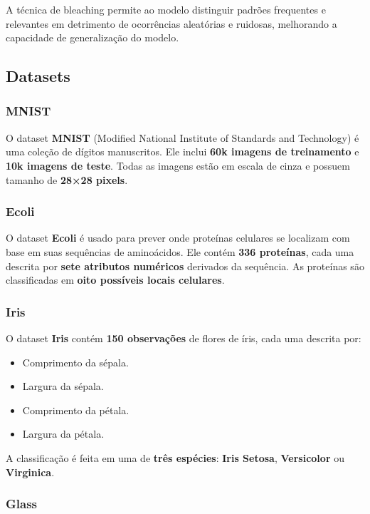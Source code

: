 \documentclass{article}
\begin{document}
A técnica de bleaching permite ao modelo distinguir padrões frequentes e relevantes em detrimento de ocorrências aleatórias e ruidosas, melhorando a capacidade de generalização do modelo.

\subsection{Datasets}

\subsubsection{MNIST}

O dataset \textbf{MNIST} (Modified National Institute of Standards and Technology) é uma coleção de dígitos manuscritos. Ele inclui \textbf{60k imagens de treinamento} e \textbf{10k imagens de teste}. Todas as imagens estão em escala de cinza e possuem tamanho de \textbf{28×28 pixels}.

\subsubsection{Ecoli}

O dataset \textbf{Ecoli} é usado para prever onde proteínas celulares se localizam com base em suas sequências de aminoácidos. Ele contém \textbf{336 proteínas}, cada uma descrita por \textbf{sete atributos numéricos} derivados da sequência. As proteínas são classificadas em \textbf{oito possíveis locais celulares}.

\subsubsection{Iris}

O dataset \textbf{Iris} contém \textbf{150 observações} de flores de íris, cada uma descrita por:

\begin{itemize}
    \item Comprimento da sépala.
    \item Largura da sépala.
    \item Comprimento da pétala.
    \item Largura da pétala.
\end{itemize}

A classificação é feita em uma de \textbf{três espécies}: \textbf{Iris Setosa}, \textbf{Versicolor} ou \textbf{Virginica}.

\subsubsection{Glass}
\end{document}
